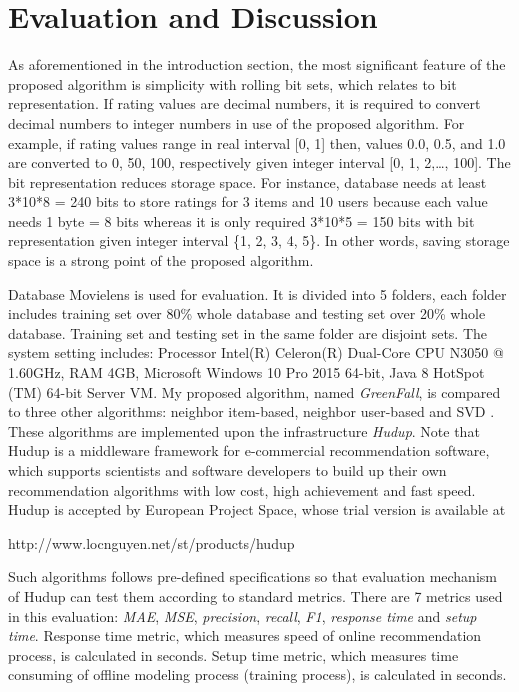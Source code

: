 \documentclass[10pt]{article}
\begin{document}
\section{Evaluation and Discussion} \label{section:evaluation}
As aforementioned in the introduction section, the most significant feature of the proposed algorithm is simplicity with rolling bit sets, which relates to bit representation. If rating values are decimal numbers, it is required to convert decimal numbers to integer numbers in use of the proposed algorithm. For example, if rating values range in real interval [0, 1] then, values 0.0, 0.5, and 1.0 are converted to 0, 50, 100, respectively given integer interval [0, 1, 2,\ldots, 100]. The bit representation reduces storage space. For instance, database needs at least 3*10*8 = 240 bits to store ratings for 3 items and 10 users because each value needs 1 byte = 8 bits whereas it is only required 3*10*5 = 150 bits with bit representation given integer interval \{1, 2, 3, 4, 5\}. In other words, saving storage space is a strong point of the proposed algorithm.

Database Movielens \cite{groupLens:movielens} is used for evaluation. It is divided into 5 folders, each folder includes training set over 80\% whole database and testing set over 20\% whole database. Training set and testing set in the same folder are disjoint sets. The system setting includes: Processor Intel(R) Celeron(R) Dual-Core CPU N3050 @ 1.60GHz, RAM 4GB, Microsoft Windows 10 Pro 2015 64-bit, Java 8 HotSpot (TM) 64-bit Server VM. My proposed algorithm, named \textit{GreenFall}, is compared to three other algorithms: neighbor item-based, neighbor user-based and SVD \cite[pp.~151-152]{ricci:recommender}. These algorithms are implemented upon the infrastructure \textit{Hudup}. Note that Hudup is a middleware framework for e-commercial recommendation software, which supports scientists and software developers to build up their own recommendation algorithms with low cost, high achievement and fast speed. Hudup is accepted by European Project Space, whose trial version is available at

http://www.locnguyen.net/st/products/hudup

Such algorithms follows pre-defined specifications so that evaluation mechanism of Hudup can test them according to standard metrics. There are 7 metrics \cite[pp.~19-39]{herlocker:evaluation} used in this evaluation: \textit{MAE}, \textit{MSE}, \textit{precision}, \textit{recall}, \textit{F1}, \textit{response time} and \textit{setup time}. Response time metric, which measures speed of online recommendation process, is calculated in seconds. Setup time metric, which measures time consuming of offline modeling process (training process), is calculated in seconds.
\end{document}
